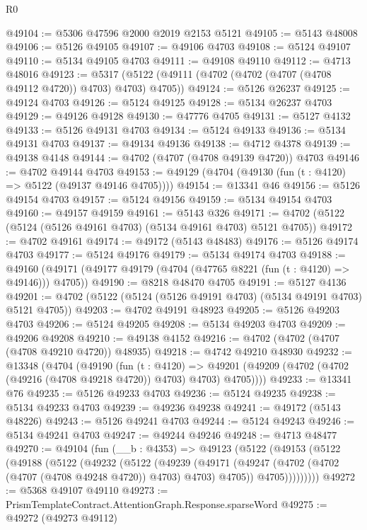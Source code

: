 \begin{lexlean}{R0}
\begin{coremodule}
@49104 := @5306 @47596 @2000 @2019 @2153 @5121
@49105 := @5143 @48008
@49106 := @5126 @49105
@49107 := @49106 @4703
@49108 := @5124 @49107
@49110 := @5134 @49105 @4703
@49111 := @49108 @49110
@49112 := @4713 @48016
@49123 := @5317 (@5122 (@49111 (@4702 (@4702 (@4707 (@4708 @49112 @4720)) @4703) @4703) @4705))
@49124 := @5126 @26237
@49125 := @49124 @4703
@49126 := @5124 @49125
@49128 := @5134 @26237 @4703
@49129 := @49126 @49128
@49130 := @47776 @4705
@49131 := @5127 @4132
@49133 := @5126 @49131 @4703
@49134 := @5124 @49133
@49136 := @5134 @49131 @4703
@49137 := @49134 @49136
@49138 := @4712 @4378
@49139 := @49138 @4148
@49144 := @4702 (@4707 (@4708 @49139 @4720)) @4703
@49146 := @4702 @49144 @4703
@49153 := @49129 (@4704 (@49130 (fun (t : @4120) => @5122 (@49137 @49146 @4705))))
@49154 := @13341 @46
@49156 := @5126 @49154 @4703
@49157 := @5124 @49156
@49159 := @5134 @49154 @4703
@49160 := @49157 @49159
@49161 := @5143 @326
@49171 := @4702 (@5122 (@5124 (@5126 @49161 @4703) (@5134 @49161 @4703) @5121 @4705))
@49172 := @4702 @49161
@49174 := @49172 (@5143 @48483)
@49176 := @5126 @49174 @4703
@49177 := @5124 @49176
@49179 := @5134 @49174 @4703
@49188 := @49160 (@49171 (@49177 @49179 (@4704 (@47765 @8221 (fun (t : @4120) => @49146))) @4705))
@49190 := @8218 @48470 @4705
@49191 := @5127 @4136
@49201 := @4702 (@5122 (@5124 (@5126 @49191 @4703) (@5134 @49191 @4703) @5121 @4705))
@49203 := @4702 @49191 @48923
@49205 := @5126 @49203 @4703
@49206 := @5124 @49205
@49208 := @5134 @49203 @4703
@49209 := @49206 @49208
@49210 := @49138 @4152
@49216 := @4702 (@4702 (@4707 (@4708 @49210 @4720)) @48935)
@49218 := @4742 @49210 @48930
@49232 := @13348
    (@4704
      (@49190
        (fun (t : @4120) =>
        @49201 (@49209 (@4702 (@4702 (@49216 (@4708 @49218 @4720)) @4703) @4703) @4705))))
@49233 := @13341 @76
@49235 := @5126 @49233 @4703
@49236 := @5124 @49235
@49238 := @5134 @49233 @4703
@49239 := @49236 @49238
@49241 := @49172 (@5143 @48226)
@49243 := @5126 @49241 @4703
@49244 := @5124 @49243
@49246 := @5134 @49241 @4703
@49247 := @49244 @49246
@49248 := @4713 @48477
@49270 := @49104
    (fun (__b : @4353) =>
    @49123
      (@5122
        (@49153
          (@5122
            (@49188
              (@5122
                (@49232
                  (@5122
                    (@49239
                      (@49171
                        (@49247 (@4702 (@4702 (@4707 (@4708 @49248 @4720)) @4703) @4703) @4705))
                      @4705)))))))))
@49272 := @5368 @49107 @49110
@49273 := PrismTemplateContract.AttentionGraph.Response.sparseWord
@49275 := @49272 (@49273 @49112)

\end{coremodule}
\end{lexlean}
